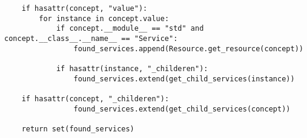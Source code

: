 \begin{minipage}{\textwidth}
\begin{lstlisting}
    if hasattr(concept, "value"):
        for instance in concept.value:
            if concept.__module__ == "std" and concept.__class__.__name__ == "Service":
                found_services.append(Resource.get_resource(concept))
             
            if hasattr(instance, "_childeren"):
                found_services.extend(get_child_services(instance))
                
    if hasattr(concept, "_childeren"):
                found_services.extend(get_child_services(concept))                
 
    return set(found_services)
\end{lstlisting}
\end{minipage}
